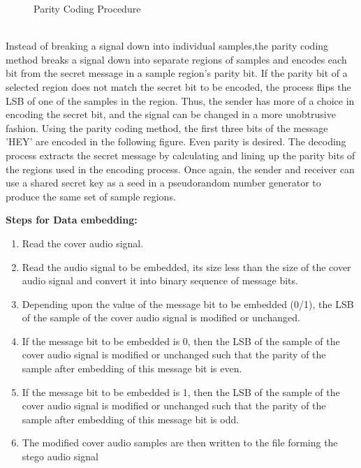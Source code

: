 \documentclass[a4paper, 12pt, notitlepage]{report}
\begin{document}
\begin{figure}[h!]
{\par}
\caption{Parity Coding Procedure}
\end{figure}\\

Instead of breaking  a  signal  down into individual  samples,the  parity  coding  method  breaks  a  signal  down  into  separate regions  of  samples  and  encodes  each  bit  from  the  secret message  in  a  sample  region's  parity  bit.  If  the  parity  bit  of  a selected region does not match the secret bit to be encoded, the process flips the LSB of one of the samples in the region. Thus, the sender has more of a choice in encoding the secret bit, and the signal can be changed in a more unobtrusive fashion. 
Using  the  parity  coding  method,  the  first  three  bits  of  the message 'HEY' are encoded in the following figure. Even parity 
is desired. The decoding process extracts the secret message by calculating  and  lining up  the  parity  bits  of  the  regions  used  in the encoding process. Once again, the sender and receiver can use  a  shared  secret  key  as  a  seed  in  a  pseudorandom  number generator to produce the same set of sample regions.\\

\begin{block}{\textbf{Steps for Data embedding:}}
\begin{enumerate}
  \item {
    Read the cover audio signal.  
  }
	\item {
   Read the audio signal to be embedded, its size less than the size of the cover audio signal and convert it into binary sequence of message bits.
  }
	\item {
Depending upon the value of the message bit to be embedded (0/1), the LSB of the sample of the cover audio signal is modified or unchanged. 
  }
	\item {
If the message bit to be embedded is 0, then the LSB of the sample of the cover audio signal is modified or unchanged such that the parity of the sample after embedding of this message bit is even.  
}
\item If the message bit to be embedded is 1, then the LSB of the sample of the cover audio signal is modified or unchanged   
    such that the parity of the sample after embedding of this message bit is odd.
\item The modified cover audio samples are then written to the file forming the stego audio signal
  \end{enumerate}
\end{block}\\
\end{document}
